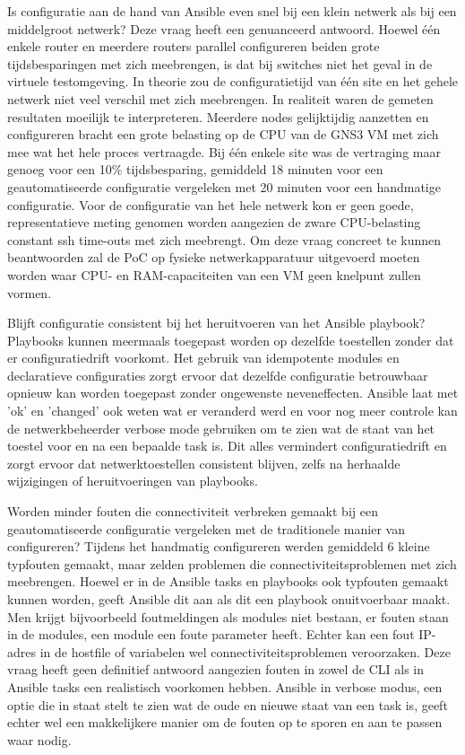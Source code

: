 Is configuratie aan de hand van Ansible even snel bij een klein netwerk als bij een middelgroot netwerk? Deze vraag heeft een genuanceerd antwoord. 
Hoewel één enkele router en meerdere routers parallel configureren beiden grote tijdsbesparingen met zich meebrengen, is dat bij switches niet het geval in de virtuele testomgeving. 
In theorie zou de configuratietijd van één site en het gehele netwerk niet veel verschil met zich meebrengen. In realiteit waren de gemeten resultaten moeilijk te interpreteren.
Meerdere nodes gelijktijdig aanzetten en configureren bracht een grote belasting op de CPU van de GNS3 VM met zich mee wat het hele proces vertraagde. 
Bij één enkele site was de vertraging maar genoeg voor een 10\% tijdsbesparing, gemiddeld 18 minuten voor een geautomatiseerde configuratie vergeleken met 20 minuten voor een handmatige configuratie.
Voor de configuratie van het hele netwerk kon er geen goede, representatieve meting genomen worden aangezien de zware CPU-belasting constant ssh time-outs met zich meebrengt.
Om deze vraag concreet te kunnen beantwoorden zal de PoC op fysieke netwerkapparatuur uitgevoerd moeten worden waar CPU- en RAM-capaciteiten van een VM geen knelpunt zullen vormen.
\vspace{1em}

Blijft configuratie consistent bij het heruitvoeren van het Ansible playbook?
Playbooks kunnen meermaals toegepast worden op dezelfde toestellen zonder dat er configuratiedrift voorkomt.
Het gebruik van idempotente modules en declaratieve configuraties zorgt ervoor dat dezelfde configuratie betrouwbaar opnieuw kan worden toegepast zonder ongewenste neveneffecten.
Ansible laat met 'ok' en 'changed' ook weten wat er veranderd werd en voor nog meer controle kan de netwerkbeheerder verbose mode gebruiken om te zien wat de staat van het toestel voor en na een bepaalde task is.
Dit alles vermindert configuratiedrift en zorgt ervoor dat netwerktoestellen consistent blijven, zelfs na herhaalde wijzigingen of heruitvoeringen van playbooks.
\vspace{1em}

Worden minder fouten die connectiviteit verbreken gemaakt bij een geautomatiseerde configuratie vergeleken met de traditionele manier van configureren?
Tijdens het handmatig configureren werden gemiddeld 6 kleine typfouten gemaakt, maar zelden problemen die connectiviteitsproblemen met zich meebrengen. 
Hoewel er in de Ansible tasks en playbooks ook typfouten gemaakt kunnen worden, geeft Ansible dit aan als dit een playbook onuitvoerbaar maakt.
Men krijgt bijvoorbeeld foutmeldingen als modules niet bestaan, er fouten staan in de modules, een module een foute parameter heeft.
Echter kan een fout IP-adres in de hostfile of variabelen wel connectiviteitsproblemen veroorzaken.
Deze vraag heeft geen definitief antwoord aangezien fouten in zowel de CLI als in Ansible tasks een realistisch voorkomen hebben.
Ansible in verbose modus, een optie die in staat stelt te zien wat de oude en nieuwe staat van een task is, geeft echter wel een makkelijkere manier om de fouten op te sporen en aan te passen waar nodig.
\vspace{1em}

